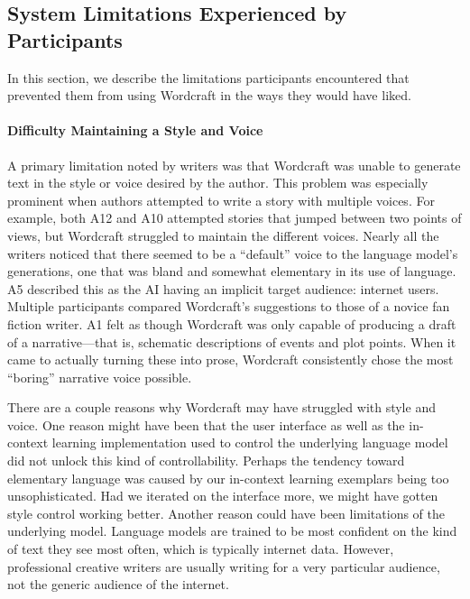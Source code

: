 \subsection{System Limitations Experienced by Participants}
In this section, we describe the limitations participants encountered that prevented them from using Wordcraft in the ways they would have liked. 

\paragraph{Difficulty Maintaining a Style and Voice}
A primary limitation noted by writers was that Wordcraft was unable to generate text in the style or voice desired by the author.
This problem was especially prominent when authors attempted to write a story with multiple voices.
For example, both A12 and A10 attempted stories that jumped between two points of views, but Wordcraft struggled to maintain the different voices.
Nearly all the writers noticed that there seemed to be a ``default'' voice to the language model's generations, one that was bland and somewhat elementary in its use of language.
A5 described this as the AI having an implicit target audience: internet users.
Multiple participants compared Wordcraft's suggestions to those of a novice fan fiction writer. 
A1 felt as though Wordcraft was only capable of producing a draft of a narrative---that is, schematic descriptions of events and plot points. When it came to actually turning these into prose, Wordcraft consistently chose the most ``boring'' narrative voice possible.

There are a couple reasons why Wordcraft may have struggled with style and voice.
One reason might have been that the user interface as well as the in-context learning implementation used to control the underlying language model did not unlock this kind of controllability.
Perhaps the tendency toward elementary language was caused by our in-context learning exemplars being too unsophisticated.
Had we iterated on the interface more, we might have gotten style control working better.
Another reason could have been limitations of the underlying model.
Language models are trained to be most confident on the kind of text they see most often, which is typically internet data.
However, professional creative writers are usually writing for a very particular audience, not the generic audience of the internet.

